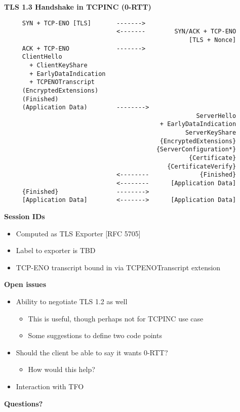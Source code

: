 \documentclass[helvetica]{seminar}
\newcommand{\heading}[1]{%
  \begin{center} 
    \large\bf 
    #1 
  \end{center} 
  \vspace{.4 in}}
\begin{document}
\begin{slide}
\heading{TLS 1.3 Handshake in TCPINC (0-RTT)}

\vspace{-5ex}
\begin{scriptsize}
\begin{verbatim}
     SYN + TCP-ENO [TLS]       ------->
                               <-------        SYN/ACK + TCP-ENO
                                                   [TLS + Nonce]
     ACK + TCP-ENO             ------->
     ClientHello
       + ClientKeyShare
       + EarlyDataIndication
       + TCPENOTranscript
     (EncryptedExtensions)
     (Finished)
     (Application Data)        -------->
                                                     ServerHello
                                           + EarlyDataIndication
                                                  ServerKeyShare
                                           {EncryptedExtensions}
                                          {ServerConfiguration*}
                                                   {Certificate}
                                             {CertificateVerify}
                               <--------              {Finished}
                               <--------      [Application Data]
     {Finished}                -------->
     [Application Data]        <------->      [Application Data]
\end{verbatim}
\end{scriptsize}
\end{slide}


\begin{slide}
\heading{Session IDs}

\begin{itemize}
\item Computed as TLS Exporter [RFC 5705]
\item Label to exporter is TBD
\item TCP-ENO transcript bound in via TCPENOTranscript extension
\end{itemize}
\end{slide}


\begin{slide}
\heading{Open issues}

\begin{itemize}
\item Ability to negotiate TLS 1.2 as well
  \begin{itemize}
  \item This is useful, though perhaps not for TCPINC use case
  \item Some suggestions to define two code points
  \end{itemize}

\item Should the client be able to say it wants 0-RTT?
  \begin{itemize}
  \item How would this help?
  \end{itemize}

\item Interaction with TFO
\end{itemize}
\end{slide}

\begin{slide}
\heading{Questions?}

\end{slide}
\end{document}
